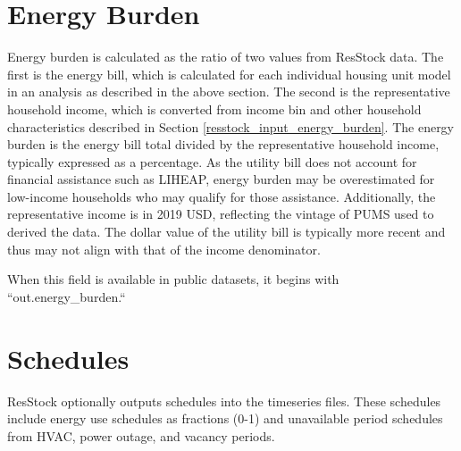 \section{Energy Burden}
Energy burden is calculated as the ratio of two values from ResStock data. The first is the energy bill, which is calculated for each individual housing unit model in an analysis as described in the above section. The second is the representative household income, which is converted from income bin and other household characteristics described in Section \ref{resstock_input_energy_burden}. The energy burden is the energy bill total divided by the representative household income, typically expressed as a percentage. As the utility bill does not account for financial assistance such as LIHEAP, energy burden may be overestimated for low-income households who may qualify for those assistance. Additionally, the representative income is in 2019 USD, reflecting the vintage of PUMS used to derived the data. The dollar value of the utility bill is typically more recent and thus may not align with that of the income denominator.

When this field is available in public datasets, it begins with ``out.energy\_burden.``

\section{Schedules}
ResStock optionally outputs schedules into the timeseries files. These schedules include energy use schedules as fractions (0-1) and unavailable period schedules from HVAC, power outage, and vacancy periods.

